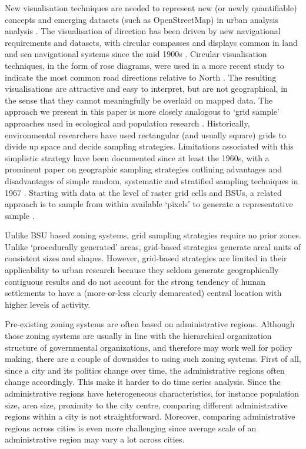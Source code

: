 \documentclass{josis}
\begin{document}
New visualisation techniques are needed to represent new (or newly quantifiable) concepts and emerging datasets (such as OpenStreetMap) in urban analysis analysis .
The visualisation of direction has been driven by new navigational requirements and datasets, with circular compasses and displays common in land and sea navigational systems since the mid 1900s \cite{honick_pictorial_1967}.
Circular visualisation techniques, in the form of rose diagrams, were used in a more recent study to indicate the most common road directions relative to North \cite{boeing_spatial_2021}.
The resulting visualisations are attractive and easy to interpret, but are not geographical, in the sense that they cannot meaningfully be overlaid on mapped data.
The approach we present in this paper is more closely analogous to `grid sample' approaches used in ecological and population research \cite{hirzel_which_2002} .
Historically, environmental researchers have used rectangular (and usually square) grids to divide up space and decide sampling strategies.
Limitations associated with this simplistic strategy have been documented since at least the 1960s, with a prominent paper on geographic sampling strategies outlining advantages and disadvantages of simple random, systematic and stratified sampling techniques in 1967 \cite{holmes_problems_1967}.
Starting with data at the level of raster grid cells and BSUs, a related approach is to sample from within available `pixels' to generate a representative sample \cite{thomson_gridsample_2017}.


Unlike BSU based zoning systems, grid sampling strategies require no prior zones.
Unlike `procedurally generated' areas, grid-based strategies generate areal units of consistent sizes and shapes.
However, grid-based strategies are limited in their applicability to urban research because they seldom generate geographically contiguous results and do not account for the strong tendency of human settlements to have a (more-or-less clearly demarcated) central location with higher levels of activity.

Pre-existing zoning systems are often based on administrative regions. Although those zoning systems are usually in line with the hierarchical organization structure of governmental organizations, and therefore may work well for policy making, there are a couple of downsides to using such zoning systems. First of all, since a city and its politics change over time, the administrative regions often change accordingly. This make it harder to do time series analysis. Since the administrative regions have heterogeneous characteristics, for instance population size, area size, proximity to the city centre, comparing different administrative regions within a city is not straightforward. Moreover, comparing administrative regions across cities is even more challenging since average scale of an administrative region may vary a lot across cities.
\end{document}
